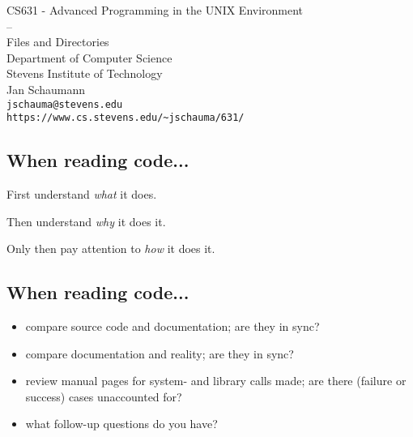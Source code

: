 \documentclass[xga]{xdvislides}
\begin{document}
\setfontphv

\lhead{\slidetitle}
\cfoot{\relax}
\rfoot{\Gray{\today}}

\vspace*{\fill}
\begin{center}
	\Hugesize
		CS631 - Advanced Programming in the UNIX Environment\\
		-- \\
		Files and Directories
	\hspace*{5mm}\blueline\\ [1em]
	\Normalsize
		Department of Computer Science\\
		Stevens Institute of Technology\\
		Jan Schaumann\\
		\verb+jschauma@stevens.edu+\\
		\verb+https://www.cs.stevens.edu/~jschauma/631/+
\end{center}
\vspace*{\fill}

\subsection{When reading code...}

\vspace*{\fill}
\begin{center}
\Huge
First understand {\em what} it does. \\
\vspace{.5in}

Then understand {\em why} it does it. \\
\vspace{.5in}

Only then pay attention to {\em how} it does it.
\Normalsize
\end{center}
\vspace*{\fill}

\subsection{When reading code...}
\begin{itemize}
	\item compare source code and documentation; are they in sync?
	\item compare documentation and reality; are they in sync?
	\item review manual pages for system- and library calls made; are
		there (failure or success) cases unaccounted for?
	\item what follow-up questions do you have?
\end{itemize}
\end{document}
